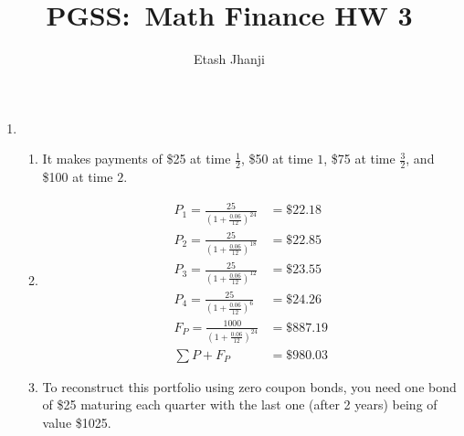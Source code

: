 \documentclass[12pt,letterpaper]{article}
\author{Etash Jhanji}
\title{PGSS:\ Math Finance HW 3}
\date{}
\begin{document}
\maketitle
\begin{enumerate}
    \item \begin{enumerate}
        \item It makes payments of \$25 at time $\frac{1}{2}$, \$50 at time $1$, \$75 at time $\frac{3}{2}$, and \$100 at time $2$. 
        \item \begin{align*}
            P_1 = \frac{25}{(1+\frac{0.06}{12})^{24}} &= \$22.18\\
            P_2 = \frac{25}{(1+\frac{0.06}{12})^{18}} &= \$22.85\\
            P_3 = \frac{25}{(1+\frac{0.06}{12})^{12}} &= \$23.55\\
            P_4 = \frac{25}{(1+\frac{0.06}{12})^{6}} &= \$24.26\\
            F_P = \frac{1000}{(1+\frac{0.06}{12})^{24}} &= \$887.19\\
            \sum{P} + F_P &= \$980.03
        \end{align*}
        \item To reconstruct this portfolio using zero coupon bonds, you need one bond of \$25 maturing each quarter with the last one (after 2 years) being of value \$1025. 
    \end{enumerate}
\end{enumerate}
\end{document}
